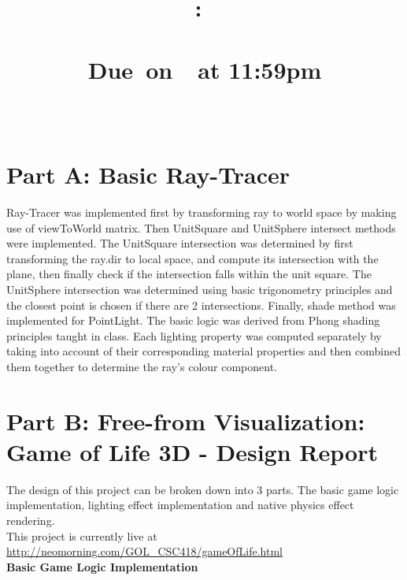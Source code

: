 \documentclass{article}
\title{
    \vspace{2in}
    \textmd{\textbf{\hmwkClass:\ \hmwkTitle}}\\
        \textmd{\textbf{\hmwkDetails}}\\
    \normalsize\vspace{0.1in}\small{Due\ on\ \hmwkDueDate\ at 11:59pm}\\
    \vspace{0.1in}\large{\textit{\hmwkClassInstructor}}
    \vspace{3in}
}
\author{
     \textbf{\hmwkAuthorNameA}
     \texttt{\hmwkAuthorStudentNumberA} \\
      \textbf{\hmwkAuthorNameB} 
     \texttt{\hmwkAuthorStudentNumberB}
}
\date{}
\begin{document}
\maketitle

\pagebreak
\section{Part A: Basic Ray-Tracer}
Ray-Tracer was implemented first by transforming ray to world space by making use of viewToWorld matrix. Then UnitSquare and UnitSphere intersect methods were implemented. The UnitSquare intersection was determined by first transforming the ray.dir to local space, and compute its intersection with the plane, then finally check if the intersection falls within the unit square. The UnitSphere intersection was determined using basic trigonometry principles and the closest point is chosen if there are 2 intersections. Finally, shade method was implemented for PointLight. The basic logic was derived from Phong shading principles taught in class. Each lighting property was computed separately by taking into account of their corresponding material properties and then combined them together to determine the ray's colour component.

\section{Part B: Free-from Visualization: Game of Life 3D - Design Report}
The design of this project can be broken down into 3 parts. The basic game logic implementation, lighting effect implementation and native physics effect rendering.\\

This project is currently live at \url{http://neomorning.com/GOL_CSC418/gameOfLife.html}\\


\textbf{Basic Game Logic Implementation}\\
\end{document}
